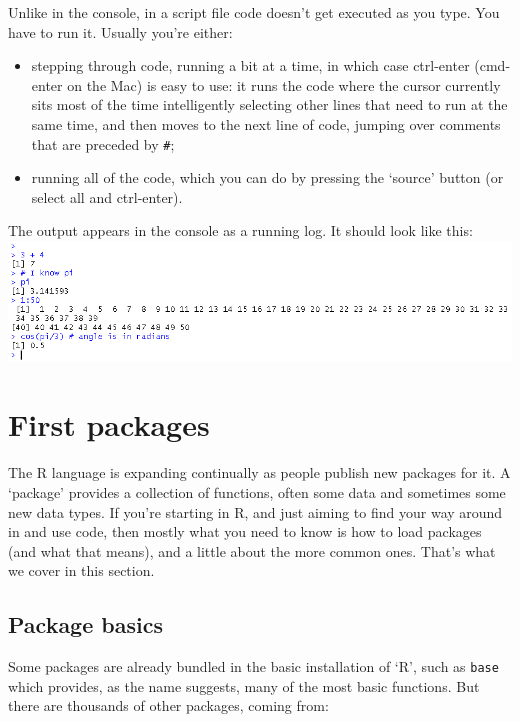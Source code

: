 \documentclass[
]{book}
\providecommand{\tightlist}{%
  \setlength{\itemsep}{0pt}\setlength{\parskip}{0pt}}
\begin{document}
Unlike in the console, in a script file code doesn't get executed as you type. You have to run it. Usually you're either:

\begin{itemize}
\tightlist
\item
  stepping through code, running a bit at a time, in which case ctrl-enter (cmd-enter on the Mac) is easy to use: it runs the code where the cursor currently sits most of the time intelligently selecting other lines that need to run at the same time, and then moves to the next line of code, jumping over comments that are preceded by \texttt{\#};
\item
  running all of the code, which you can do by pressing the `source' button (or select all and ctrl-enter).
\end{itemize}

The output appears in the console as a running log. It should look like this:
\includegraphics{images/result of 3 plus 4.png}

\hypertarget{packages}{%
\section{First packages}\label{packages}}

The R language is expanding continually as people publish new packages for it. A `package' provides a collection of functions, often some data and sometimes some new data types. If you're starting in R, and just aiming to find your way around in and use code, then mostly what you need to know is how to load packages (and what that means), and a little about the more common ones. That's what we cover in this section.

\hypertarget{twocolons}{%
\subsection{Package basics}\label{twocolons}}

Some packages are already bundled in the basic installation of `R', such as \texttt{base} which provides, as the name suggests, many of the most basic functions. But there are thousands of other packages, coming from:
\end{document}

